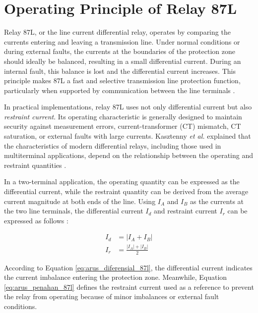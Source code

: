 \section{Operating Principle of Relay 87L}

Relay 87L, or the line current differential relay, operates by comparing the currents entering and leaving a transmission line. Under normal conditions or during external faults, the currents at the boundaries of the protection zone should ideally be balanced, resulting in a small differential current. During an internal fault, this balance is lost and the differential current increases. This principle makes 87L a fast and selective transmission line protection function, particularly when supported by communication between the line terminals \cite{ieee2015c37243}.

In practical implementations, relay 87L uses not only differential current but also \textit{restraint current}. Its operating characteristic is generally designed to maintain security against measurement errors, current-transformer (CT) mismatch, CT saturation, or external faults with large currents. Kasztenny \textit{et al.} explained that the characteristics of modern differential relays, including those used in multiterminal applications, depend on the relationship between the operating and restraint quantities \cite{kasztenny2011tutorial_multiterminal}.

In a two-terminal application, the operating quantity can be expressed as the differential current, while the restraint quantity can be derived from the average current magnitude at both ends of the line. Using \(I_A\) and \(I_B\) as the currents at the two line terminals, the differential current \(I_d\) and restraint current \(I_r\) can be expressed as follows \cite{thompson2010percentage}:

\begin{align}
    I_d & = \left| I_A + I_B \right| \label{eq:arus_diferensial_87l}                      \\
    I_r & = \frac{\left| I_A \right| + \left| I_B \right|}{2} \label{eq:arus_penahan_87l}
\end{align}

According to Equation \ref{eq:arus_diferensial_87l}, the differential current indicates the current imbalance entering the protection zone. Meanwhile, Equation \ref{eq:arus_penahan_87l} defines the restraint current used as a reference to prevent the relay from operating because of minor imbalances or external fault conditions.

